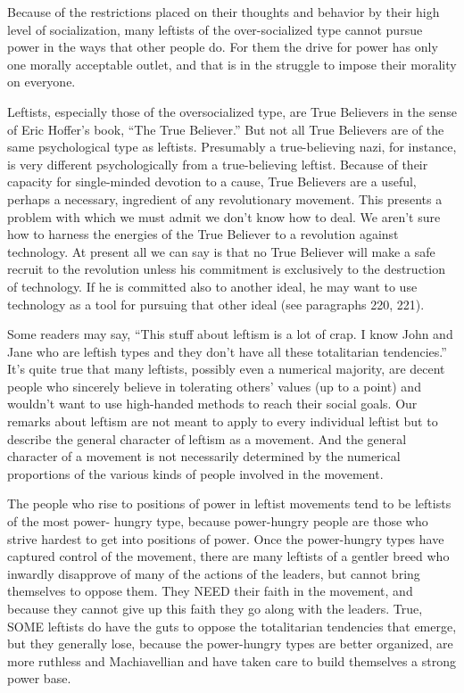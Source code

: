  Because of the restrictions placed on their thoughts and behavior by their high level of socialization, many leftists of the over-socialized type cannot pursue power in the ways that other people do. For them the drive for power has only one morally acceptable outlet, and that is in the struggle to impose their morality on everyone.

 Leftists, especially those of the oversocialized type, are True Believers in the sense of Eric Hoffer’s book, “The True Believer.” But not all True Believers are of the same psychological type as leftists. Presumably a true-believing nazi, for instance, is very different psychologically from a true-believing leftist. Because of their capacity for single-minded devotion to a cause, True Believers are a useful, perhaps a necessary, ingredient of any revolutionary movement. This presents a problem with which we must admit we don’t know how to deal. We aren’t sure how to harness the energies of the True Believer to a revolution against technology. At present all we can say is that no True Believer will make a safe recruit to the revolution unless his commitment is exclusively to the destruction of technology. If he is committed also to another ideal, he may want to use technology as a tool for pursuing that other ideal (see paragraphs 220, 221).

 Some readers may say, “This stuff about leftism is a lot of crap. I know John and Jane who are leftish types and they don’t have all these totalitarian tendencies.” It’s quite true that many leftists, possibly even a numerical majority, are decent people who sincerely believe in tolerating others’ values (up to a point) and wouldn’t want to use high-handed methods to reach their social goals. Our remarks about leftism are not meant to apply to every individual leftist but to describe the general character of leftism as a movement. And the general character of a movement is not necessarily determined by the numerical proportions of the various kinds of people involved in the movement.

 The people who rise to positions of power in leftist movements tend to be leftists of the most power- hungry type, because power-hungry people are those who strive hardest to get into positions of power. Once the power-hungry types have captured control of the movement, there are many leftists of a gentler breed who inwardly disapprove of many of the actions of the leaders, but cannot bring themselves to oppose them. They NEED their faith in the movement, and because they cannot give up this faith they go along with the leaders. True, SOME leftists do have the guts to oppose the totalitarian tendencies that emerge, but they generally lose, because the power-hungry types are better organized, are more ruthless and Machiavellian and have taken care to build themselves a strong power base.


